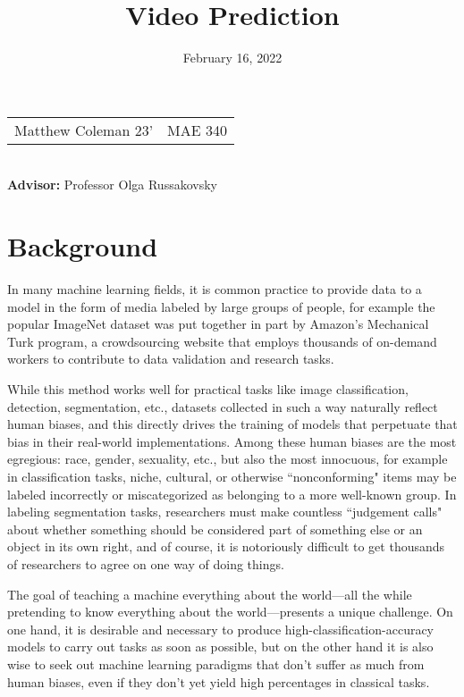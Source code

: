 \documentclass[10pt, letterpaper]{article}
\title{\vspace{-2em}
	Video Prediction
\vspace{-2em}}
\date{February 16, 2022}
\begin{document}
\maketitle
\begin{center}
	\begin{tabular}{ c c }
		Matthew Coleman 23' & MAE 340
	\end{tabular} \\
	\textbf{Advisor:} Professor Olga Russakovsky
\end{center}

\section{Background}

In many machine learning fields, it is common practice to provide data to a
model in the form of media labeled by large groups of people, for example the
popular ImageNet dataset was put together in part by Amazon's Mechanical Turk
program, a crowdsourcing website that employs thousands of on-demand workers to
contribute to data validation and research tasks. \cite{imagenet}

While this method works well for practical tasks like image classification,
detection, segmentation, etc., datasets collected in such a way naturally
reflect human biases, and this directly drives the training of models that
perpetuate that bias in their real-world implementations. \cite{olga_biases}
Among these human biases are the most egregious: race, gender, sexuality, etc.,
but also the most innocuous, for example in classification tasks, niche,
cultural, or otherwise ``nonconforming" items may be labeled incorrectly or
miscategorized as belonging to a more well-known group. In labeling
segmentation tasks, researchers must make countless ``judgement calls" about
whether something should be considered part of something else or an object in
its own right, and of course, it is notoriously difficult to get thousands of
researchers to agree on one way of doing things. \cite{labeling_disagreement}

The goal of teaching a machine everything about the world---all the while
pretending to know everything about the world---presents a unique challenge. On
one hand, it is desirable and necessary to produce high-classification-accuracy
models to carry out tasks as soon as possible, but on the other hand it is also
wise to seek out machine learning paradigms that don't suffer as much from
human biases, even if they don't yet yield high percentages in classical tasks.
\end{document}
